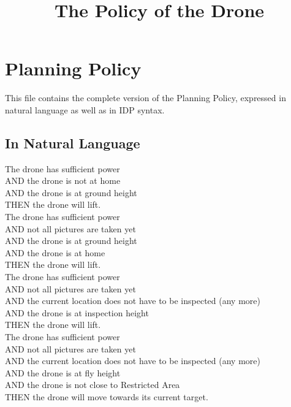 \documentclass{article}
\begin{document}
\title{The Policy of the Drone}
\date{}
\author{}
\maketitle

\section{Planning Policy}
This file contains the complete version of the Planning Policy, expressed in natural language as well as in IDP syntax.
\label{app:ppolicy}
\subsection{In Natural Language}
The drone has sufficient power\\
\indent AND the drone is not at home\\
\indent AND the drone is at ground height\\
\indent THEN the drone will lift.
\newline\\
The drone has sufficient power\\
\indent AND not all pictures are taken yet\\
\indent AND the drone is at ground height\\
\indent AND the drone is at home\\
\indent THEN the drone will lift.
\newline\\
The drone has sufficient power\\
\indent AND not all pictures are taken yet\\
\indent AND the current location does not have to be inspected (any more)\\
\indent AND the drone is at inspection height\\
\indent THEN the drone will lift.
\newline\\
The drone has sufficient power\\
\indent AND not all pictures are taken yet\\
\indent AND the current location does not have to be inspected (any more)\\
\indent AND the drone is at fly height\\
\indent AND the drone is not close to Restricted Area\\
\indent THEN the drone will move towards its current target.
\newpage
\noindent
\end{document}
